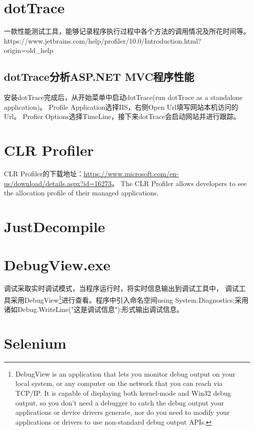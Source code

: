 \documentclass{book}
\begin{document}
\section{dotTrace}

一款性能测试工具，能够记录程序执行过程中各个方法的调用情况及所花时间等。
https://www.jetbrains.com/help/profiler/10.0/Introduction.html?origin=old\_help

\subsection{dotTrace分析ASP.NET MVC程序性能}

安装dotTrace完成后，从开始菜单中启动dotTrace(run dotTrace as a standalone application)。
Profile Application选择IIS，右侧Open Url填写网站本机访问的Url。
Profier Options选择TimeLine，接下来dotTrace会启动网站并进行跟踪。

\section{CLR Profiler}

CLR Profiler的下载地址：\url{https://www.microsoft.com/en-us/download/details.aspx?id=16273}。
The CLR Profiler allows developers to see the allocation profile of their managed applications.




\section{JustDecompile}

\section{DebugView.exe}

调试采取实时调试模式，当程序运行时，将实时信息输出到调试工具中，
调试工具采用DebugView\footnote{DebugView is an application that lets you monitor debug output on your local system, or any computer on the network that you can reach via TCP/IP. It is capable of displaying both kernel-mode and Win32 debug output, so you don't need a debugger to catch the debug output your applications or device drivers generate, nor do you need to modify your applications or drivers to use non-standard debug output APIs.}进行查看。程序中引入命名空间using System.Diagnostics;采用诸如Debug.WriteLine("这是调试信息");形式输出调试信息。

\section{Selenium}
\end{document}
